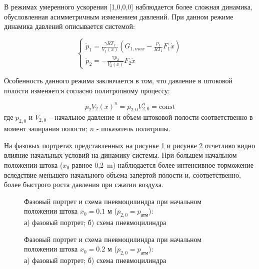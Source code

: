 В режимах умеренного ускорения [1,0,0,0]
наблюдается более сложная динамика, обусловленная асимметричным изменением давлений.
При данном режиме динамика давлений описывается системой:

\begin{equation}
	\begin{cases}
		\dot{p}_1 = \frac{\gamma RT_1}{V_1(x)}\left(G_{1,max} - \frac{p_1}{RT_1}F_1\dot{x}\right) \\
		\dot{p}_2 = -\frac{\gamma p_2}{V_2(x)}F_2\dot{x}
	\end{cases}
\end{equation}

Особенность данного режима заключается в том, что давление в штоковой полости изменяется согласно политропному процессу:

\begin{equation}
	p_2V_2(x)^n = p_{2,0}V_{2,0}^n = \text{const}
\end{equation}
где $p_{2,0}$ и $V_{2,0}$ -- начальное давление и объем штоковой полости соответственно в момент запирания полости;
$n$ - показатель политропы.

На фазовых портретах представленных на рисунке \ref{fig:pp_moderate_position_1} и рисунке \ref{fig:pp_moderate_position_2}
отчетливо видно влияние начальных условий на динамику системы. При большем начальном положении штока ($x_0$ равное 0,2~\si{\metre}) наблюдается более
интенсивное торможение вследствие меньшего начального объема запертой полости и, соответственно, более быстрого роста давления при сжатии воздуха.


\begin{figure}[htbp]
	\caption{Фазовый портрет и схема пневмоцилиндра при начальном положении штока $x_0 = \num{0.1}$ м ($p_{2,0} = p_\text{атм}$):\\
		а) фазовый портрет; б) схема пневмоцилиндра}
	\label{fig:pp_moderate_position_1}
\end{figure}

\begin{figure}[htbp]
	\caption{Фазовый портрет и схема пневмоцилиндра при начальном положении штока $x_0 = \num{0.2}$ м ($p_{2,0} = p_\text{атм}$):\\
		а) фазовый портрет; б) схема пневмоцилиндра}
	\label{fig:pp_moderate_position_2}
\end{figure}

